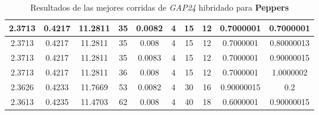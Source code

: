 \begin{table}[h!]
\begin{center}
\begin{tabular}{|c|c|c|c|c|c|c|c|c|c|}
            2.3713 & 0.4217  & 11.2811 & 35 & 0.0082 & 4 & 15 & 12 & 0.7000001 & 0.7000001\\
        \hline
        \hline
            2.3713 & 0.4217  & 11.2811 & 35 & 0.008 & 4 & 15 & 12 & 0.7000001 & 0.80000013\\
        \hline
        \hline
            2.3713 & 0.4217  & 11.2811 & 35 & 0.0083 & 4 & 15 & 12 & 0.7000001 & 0.90000015\\
        \hline
        \hline
            2.3713 & 0.4217  & 11.2811 & 36 & 0.008 & 4 & 15 & 12 & 0.7000001 & 1.0000002\\
        \hline
        \hline
            2.3626 & 0.4233  & 11.7669 & 53 & 0.0082 & 4 & 30 & 16 & 0.90000015 & 0.2\\
        \hline
        \hline
            2.3613 & 0.4235  & 11.4703 & 62 & 0.008 & 4 & 40 & 18 & 0.6000001 & 0.90000015\\
        \hline
        \end{tabular}
        \caption{Resultados de las mejores corridas de \emph{GAP24} hibridado para {\bf Peppers}}
        \label{tb:tableGAP24}
    \end{center}
\end{table}
